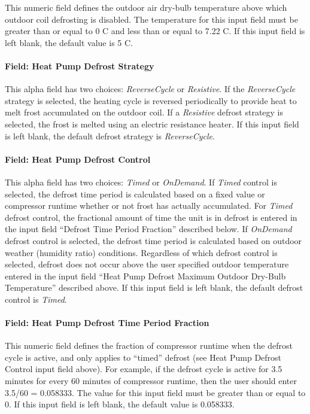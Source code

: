 This numeric field defines the outdoor air dry-bulb temperature above which outdoor coil defrosting is disabled. The temperature for this input field must be greater than or equal to 0 C and less than or equal to 7.22 C. If this input field is left blank, the default value is 5 C.

\paragraph{Field: Heat Pump Defrost Strategy}\label{field-heat-pump-defrost-strategy-2}

This alpha field has two choices: \emph{ReverseCycle} or \emph{Resistive}. If the \emph{ReverseCycle} strategy is selected, the heating cycle is reversed periodically to provide heat to melt frost accumulated on the outdoor coil. If a \emph{Resistive} defrost strategy is selected, the frost is melted using an electric resistance heater. If this input field is left blank, the default defrost strategy is \emph{ReverseCycle}.

\paragraph{Field: Heat Pump Defrost Control}\label{field-heat-pump-defrost-control-2}

This alpha field has two choices: \emph{Timed} or \emph{OnDemand}. If \emph{Timed} control is selected, the defrost time period is calculated based on a fixed value or compressor runtime whether or not frost has actually accumulated. For \emph{Timed} defrost control, the fractional amount of time the unit is in defrost is entered in the input field ``Defrost Time Period Fraction'' described below. If \emph{OnDemand} defrost control is selected, the defrost time period is calculated based on outdoor weather (humidity ratio) conditions. Regardless of which defrost control is selected, defrost does not occur above the user specified outdoor temperature entered in the input field ``Heat Pump Defrost Maximum Outdoor Dry-Bulb Temperature'' described above. If this input field is left blank, the default defrost control is \emph{Timed}.

\paragraph{Field: Heat Pump Defrost Time Period Fraction}\label{field-heat-pump-defrost-time-period-fraction-2}

This numeric field defines the fraction of compressor runtime when the defrost cycle is active, and only applies to ``timed'' defrost (see Heat Pump Defrost Control input field above). For example, if the defrost cycle is active for 3.5 minutes for every 60 minutes of compressor runtime, then the user should enter 3.5/60 = 0.058333. The value for this input field must be greater than or equal to 0. If this input field is left blank, the default value is 0.058333.


